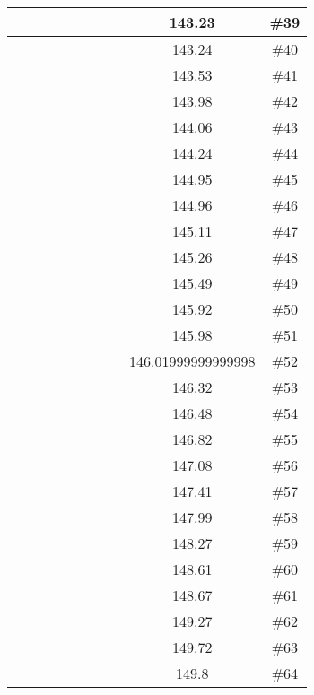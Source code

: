 \begin{center}
\begin{longtable}{|c|c|c|c|c|c|c|c|c|c|}
 \x &  \x &  \x &  &  &  &  \x &  \x & 143.23 & \#39 \\ \hline
 \x &  &  \x &  \x &  &  \x &  &  \x & 143.24 & \#40 \\ \hline
 \x &  \x &  &  \x &  &  &  &  \x & 143.53 & \#41 \\ \hline
 \x &  \x &  &  &  \x &  &  &  & 143.98 & \#42 \\ \hline
 \x &  \x &  \x &  &  \x &  &  &  \x & 144.06 & \#43 \\ \hline
 \x &  \x &  \x &  &  &  \x &  \x &  & 144.24 & \#44 \\ \hline
 \x &  &  &  \x &  \x &  \x &  &  & 144.95 & \#45 \\ \hline
 \x &  \x &  \x &  &  \x &  \x &  &  & 144.96 & \#46 \\ \hline
 \x &  &  &  &  &  \x &  &  \x & 145.11 & \#47 \\ \hline
 \x &  \x &  &  \x &  \x &  \x &  &  & 145.26 & \#48 \\ \hline
 \x &  \x &  \x &  \x &  &  &  &  \x & 145.49 & \#49 \\ \hline
 \x &  &  \x &  &  \x &  \x &  \x &  & 145.92 & \#50 \\ \hline
 \x &  &  \x &  &  \x &  &  \x &  \x & 145.98 & \#51 \\ \hline
 \x &  &  \x &  &  &  &  \x &  \x & 146.01999999999998 & \#52 \\ \hline
 \x &  \x &  \x &  \x &  &  &  \x &  \x & 146.32 & \#53 \\ \hline
 \x &  &  \x &  \x &  &  &  &  \x & 146.48 & \#54 \\ \hline
 \x &  &  \x &  &  \x &  &  &  & 146.82 & \#55 \\ \hline
 \x &  \x &  &  &  &  &  \x &  \x & 147.08 & \#56 \\ \hline
 \x &  &  &  \x &  &  &  &  & 147.41 & \#57 \\ \hline
 \x &  \x &  &  \x &  \x &  \x &  \x &  \x & 147.99 & \#58 \\ \hline
 \x &  \x &  \x &  \x &  &  \x &  \x &  & 148.27 & \#59 \\ \hline
 \x &  &  \x &  \x &  \x &  \x &  &  & 148.61 & \#60 \\ \hline
 \x &  &  &  \x &  \x &  &  &  \x & 148.67 & \#61 \\ \hline
 \x &  &  &  \x &  &  &  &  \x & 149.27 & \#62 \\ \hline
 \x &  &  &  &  &  &  &  & 149.72 & \#63 \\ \hline
 \x &  &  \x &  &  &  &  \x &  & 149.8 & \#64 \\ \hline

\end{longtable}
\end{center}
